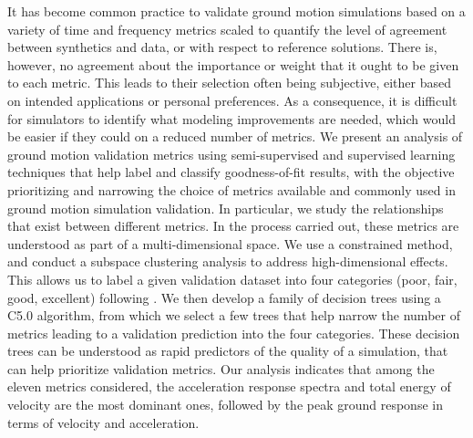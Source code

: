 % 
It has become common practice to validate ground motion simulations based on a variety of time and frequency metrics scaled to quantify the level of agreement between synthetics and data, or with respect to reference solutions. There is, however, no agreement about the importance or weight that it ought to be given to each metric. This leads to their selection often being subjective, either based on intended applications or personal preferences. As a consequence, it is difficult for simulators to identify what modeling improvements are needed, which would be easier if they could  on a reduced number of metrics. We present an analysis of ground motion validation metrics using semi-supervised and supervised learning techniques that help label and classify goodness-of-fit results, with the objective  prioritizing and narrowing the choice of metrics available and commonly used in ground motion simulation validation.  In particular, we study the relationships that exist between   different metrics. In the process carried out, these metrics are understood as part of a multi-dimensional space. We use a constrained \kmeans{} method, and conduct a subspace clustering analysis to address high-dimensional effects. This allows us to label a given validation dataset into four categories (poor, fair, good, excellent) following  . We then develop a family of decision trees using a C5.0 algorithm, from which we select a few trees that help narrow the number of metrics leading to a validation prediction into the four categories. These decision trees can be understood as rapid predictors of the quality of a simulation,  that can help prioritize validation metrics. Our analysis indicates that among the eleven metrics considered, the acceleration response spectra and total energy of velocity are the most dominant ones, followed by the peak ground response in terms of velocity and acceleration. 
